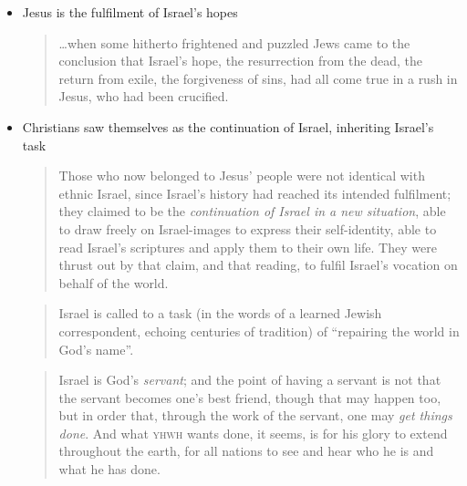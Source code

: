\begin{itemize}
    \item Jesus is the fulfilment of Israel's hopes

        \begin{quote}
            \dots when some hitherto frightened and puzzled Jews came to the
            conclusion that Israel's hope, the resurrection from the dead, the
            return from exile, the forgiveness of sins, had all come true in a
            rush in Jesus, who had been crucified.
            \autocite[452]{wright:1992}
        \end{quote}

    \item Christians saw themselves as the continuation of Israel, inheriting
        Israel's task

        \begin{quote}
            Those who now belonged to Jesus' people were not identical with
            ethnic Israel, since Israel's history had reached its intended
            fulfilment; they claimed to be the \textit{continuation of Israel in
            a new situation}, able to draw freely on Israel-images to express
            their self-identity, able to read Israel's scriptures and apply them
            to their own life. They were thrust out by that claim, and that
            reading, to fulfil Israel's vocation on behalf of the world.
            \autocite[457, emphasis original]{wright:1992}
        \end{quote}

        \begin{quote}
            Israel is called to a task (in the words of a learned Jewish
            correspondent, echoing centuries of tradition) of \enquote{repairing
            the world in God's name}.
            \autocite[775]{wright:2013}
        \end{quote}

        \begin{quote}
            Israel is God's \textit{servant}; and the point of having a servant
            is not that the servant becomes one's best friend, though that may
            happen too, but in order that, through the work of the servant, one
            may \textit{get things done}. And what \textsc{yhwh} wants done, it
            seems, is for his glory to extend throughout the earth, for all
            nations to see and hear who he is and what he has done.
            \autocite[805]{wright:2013}
        \end{quote}


\end{itemize}
